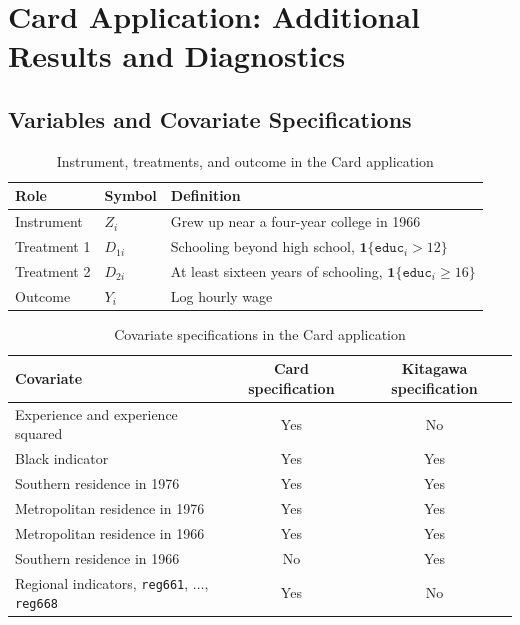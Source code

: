 \documentclass[12pt, a4paper, oneside]{article}
\theoremstyle{plain}
\theoremstyle{definition}
\begin{document}



\clearpage

\section{Card Application: Additional Results and Diagnostics}
\label{app:card_design_diagnostics}

\subsection{Variables and Covariate Specifications}
\label{app:card_variables}

\begin{table}[H]
\centering
\caption{Instrument, treatments, and outcome in the Card application}
\label{tab:card_design_appendix}
\small
\begin{tabular}{lll}
\toprule
Role & Symbol & Definition \\
\midrule
Instrument & $Z_i$ & Grew up near a four-year college in 1966 \\
Treatment 1 & $D_{1i}$ & Schooling beyond high school,
\(\mathbf{1}\{\texttt{educ}_i>12\}\) \\
Treatment 2 & $D_{2i}$ & At least sixteen years of schooling,
\(\mathbf{1}\{\texttt{educ}_i\geq16\}\) \\
Outcome & $Y_i$ & Log hourly wage \\
\bottomrule
\end{tabular}
\end{table}

\begin{table}[H]
\centering
\caption{Covariate specifications in the Card application}
\label{tab:card_covariates_appendix}
\small
\begin{tabular}{lcc}
\toprule
Covariate & Card specification & Kitagawa specification \\
\midrule
Experience and experience squared & Yes & No \\
Black indicator & Yes & Yes \\
Southern residence in 1976 & Yes & Yes \\
Metropolitan residence in 1976 & Yes & Yes \\
Metropolitan residence in 1966 & Yes & Yes \\
Southern residence in 1966 & No & Yes \\
Regional indicators, \texttt{reg661}, \(\ldots\), \texttt{reg668} & Yes & No \\
\bottomrule
\end{tabular}
\end{table}
\end{document}
